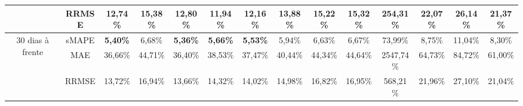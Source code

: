 \begin{landscape}
\begin{table}[!htpb]
\begin{tabular}{@{}cccccccccccccc@{}}
	& RRMSE    & 12,74\%         & 15,38\% & 12,80\%         & 11,94\%         & 12,16\%         & 13,88\%         & 15,22\%         & 15,32\% & 254,31\%        & 22,07\% & 26,14\% & 21,37\% \\ \midrule
	\multirow{3}{*}{30 dias à frente} & sMAPE    & \textbf{5,40\%} & 6,68\%  & \textbf{5,36\%} & \textbf{5,66\%} & \textbf{5,53\%} & 5,94\%          & 6,63\%          & 6,67\%  & 73,99\%         & 8,75\%  & 11,04\% & 8,30\%  \\
	& MAE      & 36,66\%         & 44,71\% & 36,40\%         & 38,53\%         & 37,47\%         & 40,44\%         & 44,34\%         & 44,64\% & 2547,74\%       & 64,73\% & 84,72\% & 61,00\% \\
	& RRMSE    & 13,72\%         & 16,94\% & 13,66\%         & 14,32\%         & 14,02\%         & 14,98\%         & 16,82\%         & 16,95\% & 568,21\%        & 21,96\% & 27,10\% & 21,04\% \\ \cmidrule(l){1-14} 
\end{tabular}
	
\end{table}

\end{landscape}

